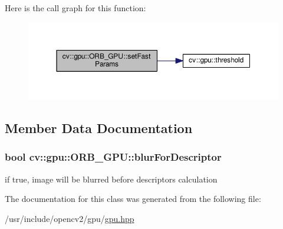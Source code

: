 Here is the call graph for this function\-:\nopagebreak
\begin{figure}[H]
\begin{center}
\leavevmode
\includegraphics[width=350pt]{classcv_1_1gpu_1_1ORB__GPU_a34ee3127b5622c799955154159c96aac_cgraph}
\end{center}
\end{figure}




\subsection{Member Data Documentation}
\hypertarget{classcv_1_1gpu_1_1ORB__GPU_a58a0701ecca568ba949cd6e0e06ebaa6}{
\subsubsection[{blur\-For\-Descriptor}]{\setlength{\rightskip}{0pt plus 5cm}bool cv\-::gpu\-::\-O\-R\-B\-\_\-\-G\-P\-U\-::blur\-For\-Descriptor}}\label{classcv_1_1gpu_1_1ORB__GPU_a58a0701ecca568ba949cd6e0e06ebaa6}


if true, image will be blurred before descriptors calculation 



The documentation for this class was generated from the following file\-:\begin{DoxyCompactItemize}
\item 
/usr/include/opencv2/gpu/\hyperlink{gpu_2gpu_8hpp}{gpu.\-hpp}\end{DoxyCompactItemize}
